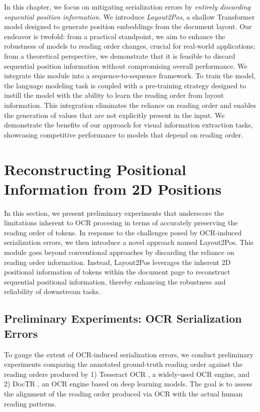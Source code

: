 In this chapter, we focus on mitigating serialization errors by \textit{entirely discarding sequential position information}. We introduce \textit{Layout2Pos}, a shallow Transformer model designed to generate position embeddings from the document layout. Our endeavor is twofold: from a practical standpoint, we aim to enhance the robustness of models to reading order changes, crucial for real-world applications; from a theoretical perspective, we demonstrate that it is feasible to discard sequential position information without compromising overall performance. We integrate this module into a sequence-to-sequence framework. To train the model, the language modeling task is coupled with a pre-training strategy designed to instill the model with the ability to learn the reading order from layout information. This integration eliminates the reliance on reading order and enables the generation of values that are not explicitly present in the input. We demonstrate the benefits of our approach for visual information extraction tasks, showcasing competitive performance to models that depend on reading order.


\section{Reconstructing Positional Information from 2D Positions}

In this section, we present preliminary experiments that underscore the limitations inherent to \ac{OCR} procesing in terms of accurately preserving the reading order of tokens. In response to the challenges posed by \ac{OCR}-induced serialization errors, we then introduce a novel approach named Layout2Pos. This module goes beyond conventional approaches by discarding the reliance on reading order information. Instead, Layout2Pos leverages the inherent 2D positional information of tokens within the document page to reconstruct sequential positional information, thereby enhancing the robustness and reliability of downstream tasks.

\subsection{Preliminary Experiments: OCR Serialization Errors}

To gauge the extent of \ac{OCR}-induced serialization errors, we conduct preliminary experiments comparing the annotated ground-truth reading order against the reading orders produced by 1) Tesseract OCR \citep{kay2007tesseract}, a widely-used \ac{OCR} engine, and 2) DocTR \citep{doctr2021}, an \ac{OCR} engine based on deep learning models. The goal is to assess the alignment of the reading order produced via \ac{OCR} with the actual human reading patterns.

